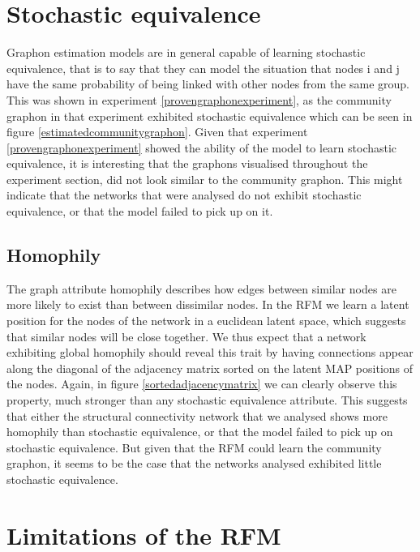 \documentclass[11pt]{report} %
\begin{document}
\section{Stochastic equivalence}
Graphon estimation models are in general capable of learning stochastic equivalence, that is to say that they can model the situation that nodes i and j have the same probability of being linked with other nodes from the same group. 
This was shown in experiment \ref{provengraphonexperiment}, as the community graphon in that experiment exhibited stochastic equivalence which can be seen in figure \ref{estimatedcommunitygraphon}. 
Given that experiment \ref{provengraphonexperiment} showed the ability of the model to learn stochastic equivalence, it is interesting that the graphons visualised throughout the experiment section, did not look similar to the community graphon. This might indicate that the networks that were analysed do not exhibit stochastic equivalence, or that the model failed to pick up on it.

\subsection{Homophily}
The graph attribute homophily describes how edges between similar nodes are more likely to exist than between dissimilar nodes. In the RFM we learn a latent position for the nodes of the network in a euclidean latent space, which suggests that similar nodes will be close together. We thus expect that a network exhibiting global homophily should reveal this trait by having connections appear along the diagonal of the adjacency matrix sorted on the latent MAP positions of the nodes. Again, in figure \ref{sortedadjacencymatrix} we can clearly observe this property, much stronger than any stochastic equivalence attribute. This suggests that either the structural connectivity network that we analysed shows more homophily than stochastic equivalence, or that the model failed to pick up on stochastic equivalence. But given that the RFM could learn the community graphon, it seems to be the case that the networks analysed exhibited little stochastic equivalence.
\section{Limitations of the RFM}
\end{document}

